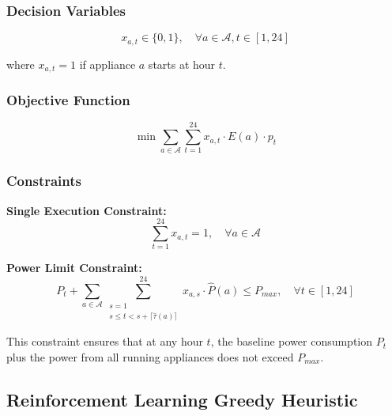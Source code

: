 \documentclass[conference]{IEEEtran}
\begin{document}
\subsubsection{Decision Variables}
\begin{equation}
x_{a,t} \in \{0, 1\}, \quad \forall a \in \mathcal{A}, t \in [1, 24]
\end{equation}

where $x_{a,t} = 1$ if appliance $a$ starts at hour $t$.

\subsubsection{Objective Function}
\begin{equation}
\min \sum_{a \in \mathcal{A}} \sum_{t=1}^{24} x_{a,t} \cdot E(a) \cdot p_t
\end{equation}

\subsubsection{Constraints}
\textbf{Single Execution Constraint:}
\begin{equation}
\sum_{t=1}^{24} x_{a,t} = 1, \quad \forall a \in \mathcal{A}
\end{equation}

\textbf{Power Limit Constraint:}
\begin{equation}
P_t + \sum_{a \in \mathcal{A}} \sum_{\substack{s=1 \\ s \leq t < s + \lceil\hat{\tau}(a)\rceil}}^{24} x_{a,s} \cdot \hat{P}(a) \leq P_{max}, \quad \forall t \in [1, 24]
\end{equation}

This constraint ensures that at any hour $t$, the baseline power consumption $P_t$ plus the power from all running appliances does not exceed $P_{max}$.

\subsection{Reinforcement Learning Greedy Heuristic}
\end{document}
